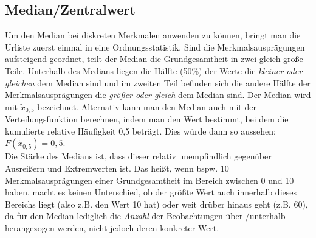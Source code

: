 \documentclass[a4paper]{article}
\begin{document}
\subsection{Median/Zentralwert}\label{sec:median}
Um den Median bei diskreten Merkmalen anwenden zu können, bringt man die Urliste zuerst einmal in eine Ordnungsstatistik.
Sind die Merkmalsausprägungen aufsteigend geordnet, teilt der Median die Grundgesamtheit in zwei gleich große Teile. Unterhalb des Medians liegen die Hälfte (50\%) der Werte die \textit{kleiner oder gleichen} dem Median sind und im zweiten Teil befinden sich die andere Hälfte der Merkmalsausprägungen die \textit{größer oder gleich} dem Median sind. Der Median wird mit $\tilde{x}_{0,5}$ bezeichnet.
Alternativ kann man den Median auch mit der Verteilungsfunktion berechnen, indem man den Wert bestimmt, bei dem die kumulierte relative Häufigkeit 0,5 beträgt. Dies würde dann so aussehen: $F(\tilde{x}_{0,5})=0,5$.\\
Die Stärke des Medians ist, dass dieser relativ unempfindlich gegenüber Ausreißern und Extremwerten ist. Das heißt, wenn bspw. 10 Merkmalsausprägungen einer Grundgesamtheit im Bereich zwischen 0 und 10 haben, macht es keinen Unterschied, ob der größte Wert auch innerhalb dieses Bereichs liegt (also z.B. den Wert 10 hat) oder weit drüber hinaus geht (z.B. 60), da für den Median lediglich die \textit{Anzahl} der Beobachtungen über-/unterhalb herangezogen werden, nicht jedoch deren konkreter Wert.
\end{document}
